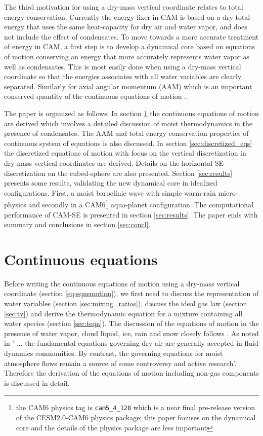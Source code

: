 \documentclass{agujournal}
\begin{document}
{The third motivation for using a dry-mass vertical coordinate relates to total energy conservation. Currently the energy fixer in CAM is based on a dry total energy \citep{WOHTTV2015JAMES} that uses the same heat-capacity for dry air and water vapor, and does not include the effect of condensates. To move towards a more accurate treatment of energy in CAM, a first step is to develop a dynamical core based on equations of motion conserving an energy that more accurately represents water vapor as well as condensates. This is most easily done when using a dry-mass vertical coordinate so that the energies associates with all water variables are clearly separated. Similarly for axial angular momentum (AAM) which is an important conserved quantity of the continuous equations of motion \citep[e.g., ][]{LHECFF2010JGR}.

The paper is organized as follows. In section \ref{sec:cont-eq} the continuous equations of motion are derived which involves a detailed discussion of moist thermodynamics in the presence of condensates. The AAM and total energy conservation properties of continuous system of equations is also discussed. In section \ref{sec:discretized_eqs} the discretized equations of motion with focus on the vertical discretization in dry-mass vertical coordinates are derived. Details on the horizontal SE discretization on the cubed-sphere are also presented. Section \ref{sec:results} presents some results, validating the new dynamical core in idealized configurations. First, a moist baroclinic wave with simple warm-rain micro-physics and secondly in a CAM6{\footnote{the CAM6 physics tag is {\tt{cam5\_4\_128}} which is a near final pre-release version of the CESM2.0-CAM6 physics package; this paper focuses on the dynamical core and the details of the physics package are less important}} aqua-planet configuration. The computational performance of CAM-SE is presented in section \ref{sec:results}. The paper ends with summary and conclusions in section \ref{sec:concl}.
%
\section{Continuous equations}\label{sec:cont-eq}
Before writing the continuous equations of motion using a dry-mass vertical coordinate (section \ref{eq:eqnsmotion}), we first need to discuss the representation of water variables (section \ref{sec:mixing_ratios}), discuss the ideal gas law (section \ref{sec:tv}) and derive the thermodynamic equation for a mixture containing all water species (section \ref{sec:teqn}). The discussion of the equations of motion in the presence of water vapor, cloud liquid, ice, rain and snow closely follows \citet{joyOfUM}. As noted in \cite{cotton2010storm} ' ... the fundamental equations governing dry air are generally accepted in fluid dynamics communities. By contrast, the governing equations for moist atmosphere flows remain a source of some controversy and active research'. Therefore the derivation of the equations of motion including non-gas components is discussed in detail.

}
\end{document}
